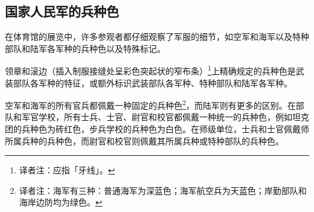 \subsection{国家人民军的兵种色}

在体育馆的展览中，许多参观者都仔细观察了军服的细节，如空军和海军以及特种部队和陆军各军种的兵种色以及特殊标记。

领章和滚边（插入制服接缝处呈彩色突起状的窄布条）\footnote{译者注：应指「牙线」。}上精确规定的兵种色是武装部队各军种的特征，或额外标识武装部队各军种、特种部队和陆军各军种。

空军和海军的所有官兵都佩戴一种固定的兵种色\footnote{译者注：海军有三种：普通海军为深蓝色；海军航空兵为天蓝色；岸勤部队和海岸边防均为绿色。\cite{clarionv}}，而陆军则有更多的区别。在部队和军官学校，所有士兵、士官、尉官和校官都佩戴一种统一的兵种色，例如坦克团的兵种色为砖红色，步兵学校的兵种色为白色。在师级单位，士兵和士官佩戴师所属兵种的兵种色，而尉官和校官则佩戴其所属兵种或特种部队的兵种色。
